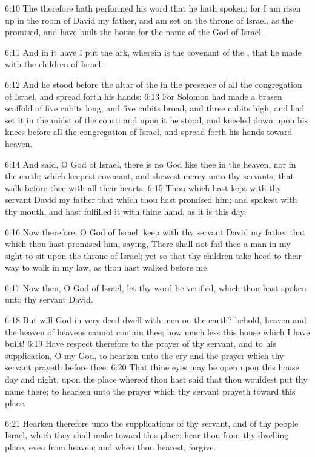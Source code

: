 6:10 The \LORD therefore hath performed his word that he hath spoken:
for I am risen up in the room of David my father, and am set on the
throne of Israel, as the \LORD promised, and have built the house for
the name of the \LORD God of Israel.

6:11 And in it have I put the ark, wherein is the covenant of the
\LORD, that he made with the children of Israel.

6:12 And he stood before the altar of the \LORD in the presence of all
the congregation of Israel, and spread forth his hands: 6:13 For
Solomon had made a brasen scaffold of five cubits long, and five
cubits broad, and three cubits high, and had set it in the midst of
the court: and upon it he stood, and kneeled down upon his knees
before all the congregation of Israel, and spread forth his hands
toward heaven.

6:14 And said, O \LORD God of Israel, there is no God like thee in the
heaven, nor in the earth; which keepest covenant, and shewest mercy
unto thy servants, that walk before thee with all their hearts: 6:15
Thou which hast kept with thy servant David my father that which thou
hast promised him; and spakest with thy mouth, and hast fulfilled it
with thine hand, as it is this day.

6:16 Now therefore, O \LORD God of Israel, keep with thy servant David
my father that which thou hast promised him, saying, There shall not
fail thee a man in my sight to sit upon the throne of Israel; yet so
that thy children take heed to their way to walk in my law, as thou
hast walked before me.

6:17 Now then, O \LORD God of Israel, let thy word be verified, which
thou hast spoken unto thy servant David.

6:18 But will God in very deed dwell with men on the earth? behold,
heaven and the heaven of heavens cannot contain thee; how much less
this house which I have built!  6:19 Have respect therefore to the
prayer of thy servant, and to his supplication, O \LORD my God, to
hearken unto the cry and the prayer which thy servant prayeth before
thee: 6:20 That thine eyes may be open upon this house day and night,
upon the place whereof thou hast said that thou wouldest put thy name
there; to hearken unto the prayer which thy servant prayeth toward
this place.

6:21 Hearken therefore unto the supplications of thy servant, and of
thy people Israel, which they shall make toward this place: hear thou
from thy dwelling place, even from heaven; and when thou hearest,
forgive.

